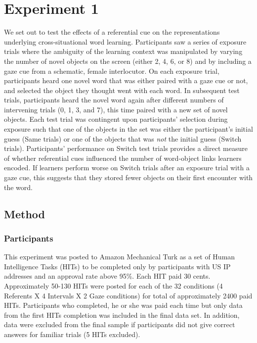 \documentclass[a4paper,man,floatsintext]{apa6}
\begin{document}
\section{Experiment 1}\label{experiment-1}

We set out to test the effects of a referential cue on the
representations underlying cross-situational word learning. Participants
saw a series of exposure trials where the ambiguity of the learning
context was manipulated by varying the number of novel objects on the
screen (either 2, 4, 6, or 8) and by including a gaze cue from a
schematic, female interlocutor. On each exposure trial, participants
heard one novel word that was either paired with a gaze cue or not, and
selected the object they thought went with each word. In subsequent test
trials, participants heard the novel word again after different numbers
of intervening trials (0, 1, 3, and 7), this time paired with a new set
of novel objects. Each test trial was contingent upon participants'
selection during exposure such that one of the objects in the set was
either the participant's initial guess (Same trials) or one of the
objects that was \emph{not} the initial guess (Switch trials).
Participants' performance on Switch test trials provides a direct
measure of whether referential cues influenced the number of word-object
links learners encoded. If learners perform worse on Switch trials after
an exposure trial with a gaze cue, this suggests that they stored fewer
objects on their first encounter with the word.

\subsection{Method}\label{method}

\subsubsection{Participants}\label{participants}

This experiment was posted to Amazon Mechanical Turk as a set of Human
Intelligence Tasks (HITs) to be completed only by participants with US
IP addresses and an approval rate above 95\%. Each HIT paid 30 cents.
Approximately 50-130 HITs were posted for each of the 32 conditions (4
Referents X 4 Intervals X 2 Gaze conditions) for total of approximately
2400 paid HITs. Participants who completed, he or she was paid each time
but only data from the first HITs completion was included in the final
data set. In addition, data were excluded from the final sample if
participants did not give correct answers for familiar trials (5 HITs
excluded).
\end{document}
